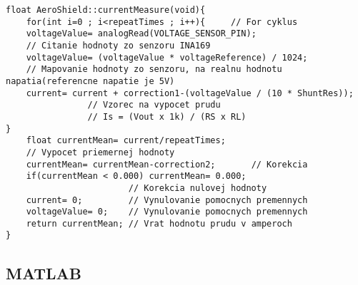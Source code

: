\begin{lstlisting}[caption={Zdrojový kód funkcie currentMeasure.},captionpos=b]	
float AeroShield::currentMeasure(void){  
	for(int i=0 ; i<repeatTimes ; i++){     // For cyklus
	voltageValue= analogRead(VOLTAGE_SENSOR_PIN);     
	// Citanie hodnoty zo senzoru INA169 
	voltageValue= (voltageValue * voltageReference) / 1024;    
	// Mapovanie hodnoty zo senzoru, na realnu hodnotu napatia(referencne napatie je 5V)
	current= current + correction1-(voltageValue / (10 * ShuntRes));    
                // Vzorec na vypocet prudu
                // Is = (Vout x 1k) / (RS x RL)
}                                                                         	
	float currentMean= current/repeatTimes;   
	// Vypocet priemernej hodnoty  
	currentMean= currentMean-correction2;       // Korekcia
	if(currentMean < 0.000) currentMean= 0.000;                 
	                    // Korekcia nulovej hodnoty
	current= 0;         // Vynulovanie pomocnych premennych   
	voltageValue= 0;    // Vynulovanie pomocnych premennych   
	return currentMean; // Vrat hodnotu prudu v amperoch
}
\end{lstlisting}
	
\subsection{MATLAB}	
	
	
	
	


